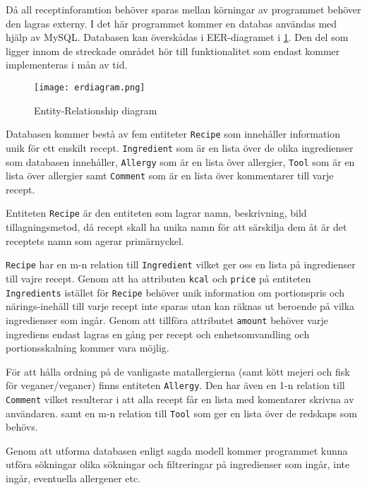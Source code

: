 Då all receptinforamtion behöver sparas mellan körningar av programmet
behöver den lagras externy. I det här programmet kommer en databas
användas med hjälp av MySQL. Databasen kan överskådas i
EER-diagramet i \ref{fig:erdiagram}. Den del som ligger innom de streckade området hör
till funktionalitet som endast kommer implementeras i mån av tid.

\begin{figure}[H]
        \centering
        \texttt{[image: erdiagram.png]}
        \caption{Entity-Relationship diagram}
        \label{fig:erdiagram}
\end{figure}

Databasen kommer bestå av fem entiteter \verb+Recipe+ som innehåller
information unik för ett enskilt recept. \verb+Ingredient+ som är en lista
över de olika ingredienser som databasen innehåller, \verb+Allergy+
som är en lista över allergier, \verb+Tool+ som är en lista över allergier samt
\verb+Comment+ som är en lista över kommentarer till varje recept.

Entiteten \verb+Recipe+ är den entiteten som lagrar namn, beskrivning, bild
tillagningsmetod, då recept skall ha unika namn för att särskilja dem åt är det
receptets namn som agerar primärnyckel.

\verb+Recipe+ har en m-n relation till \verb+Ingredient+ vilket ger oss en
lista på ingredienser till vajre recept. Genom att ha attributen \verb+kcal+ och \verb+price+
på entiteten \verb+Ingredients+ istället för \verb+Recipe+ behöver unik information om
portionspris och närings-inehåll till varje recept inte sparas utan kan räknas ut beroende på vilka
ingredienser som ingår. Genom att tillföra attributet \verb+amount+ behöver varje ingrediens
endast lagras en gång per recept och enhetsomvandling och portionsskalning kommer vara möjlig.

För att hålla ordning på de vanligaste matallergierna (samt kött mejeri och fisk för
veganer/veganer) finns entiteten \verb+Allergy+. Den har även en 1-n relation till \verb+Comment+
vilket resulterar i att alla recept får en lista med komentarer skrivna av användaren. samt en
m-n relation till \verb+Tool+ som ger en lista över de redskaps som behövs.

Genom att utforma databasen enligt sagda modell kommer programmet kunna utföra sökningar olika
sökningar och filtreringar på ingredienser som ingår, inte ingår, eventuella allergener etc.




